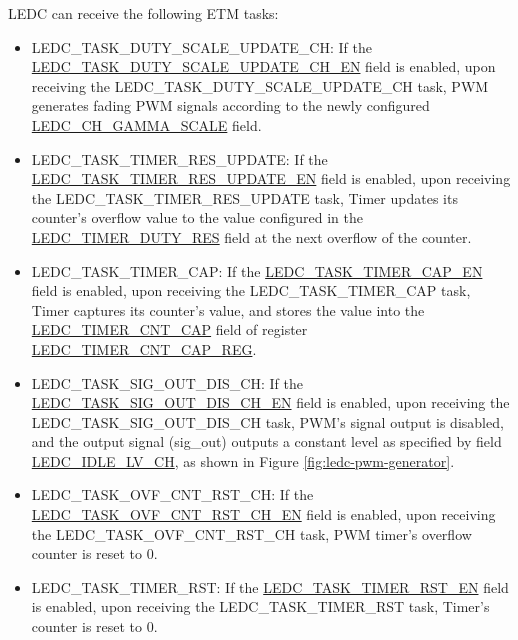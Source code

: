 \documentclass[main\_\_EN.tex]{subfiles}
\begin{document}
LEDC can receive the following ETM tasks:

\begin{itemize}
\item LEDC\_TASK\_DUTY\_SCALE\_UPDATE\_CH: If the \hyperref[fielddesc:LEDCTASKDUTYSCALEUPDATECHNEN]{LEDC\_TASK\_DUTY\_SCALE\_UPDATE\_CH\_EN} field is enabled, upon receiving the LEDC\_TASK\_DUTY\_SCALE\_UPDATE\_CH task, PWM generates fading PWM signals according to the newly configured \hyperref[fielddesc:LEDCCHNGAMMASCALE]{LEDC\_CH\_GAMMA\_SCALE} field.
\item LEDC\_TASK\_TIMER\_RES\_UPDATE: If the \hyperref[fielddesc:LEDCTASKTIMERXRESUPDATEEN]{LEDC\_TASK\_TIMER\_RES\_UPDATE\_EN} field is enabled, upon receiving the LEDC\_TASK\_TIMER\_RES\_UPDATE task, Timer updates its counter's overflow value to the value configured in the \hyperref[fielddesc:LEDCTIMERXDUTYRES]{LEDC\_TIMER\_DUTY\_RES} field at the next overflow of the counter.
\item LEDC\_TASK\_TIMER\_CAP: If the \hyperref[fielddesc:LEDCTASKTIMERXCAPEN]{LEDC\_TASK\_TIMER\_CAP\_EN} field is enabled, upon receiving the LEDC\_TASK\_TIMER\_CAP task, Timer captures its counter's value, and stores the value into the \hyperref[fielddesc:LEDCTIMERXCNTCAP]{LEDC\_TIMER\_CNT\_CAP} field of register \hyperref[regdesc:LEDCTIMERXCNTCAPREG]{LEDC\_TIMER\_CNT\_CAP\_REG}.
\item LEDC\_TASK\_SIG\_OUT\_DIS\_CH: If the \hyperref[fielddesc:LEDCTASKSIGOUTDISCHNEN]{LEDC\_TASK\_SIG\_OUT\_DIS\_CH\_EN} field is enabled, upon receiving the LEDC\_TASK\_SIG\_OUT\_DIS\_CH task, PWM's signal output is disabled, and the output signal (sig\_out) outputs a constant level as specified by field \hyperref[fielddesc:LEDCIDLELVCHN]{LEDC\_IDLE\_LV\_CH}, as shown in Figure \ref{fig:ledc-pwm-generator}.
\item LEDC\_TASK\_OVF\_CNT\_RST\_CH: If the \hyperref[fielddesc:LEDCTASKOVFCNTRSTCHNEN]{LEDC\_TASK\_OVF\_CNT\_RST\_CH\_EN} field is enabled, upon receiving the LEDC\_TASK\_OVF\_CNT\_RST\_CH task, PWM timer's overflow counter is reset to 0.
\item LEDC\_TASK\_TIMER\_RST: If the \hyperref[fielddesc:LEDCTASKTIMERXRSTEN]{LEDC\_TASK\_TIMER\_RST\_EN} field is enabled, upon receiving the LEDC\_TASK\_TIMER\_RST task, Timer's counter is reset to 0.

\end{itemize}
\end{document}
